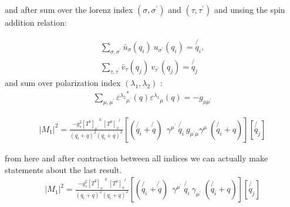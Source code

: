 and after sum over the lorenz index $({\sigma},{\sigma}^{\prime})$ and $({\tau},{\tau}^{\prime})$ and unsing the spin addition relation:
 
\begin{equation}
\begin{split}
\displaystyle\sum\limits_{{\sigma},{\sigma}^{\prime}} {\bar{u}}_{\sigma}(q_i)\:u_{{\sigma}^{\prime}}(q_i) = \not{q_i},\\
\displaystyle\sum\limits_{{\tau},{\tau}^{\prime}} {\bar{v}}_{\tau}(q_j)\:v_{{\tau}^{\prime}}(q_j) = \not{q_j}
\end{split}
\end{equation}
and sum over polarization index $({\lambda_{1}},{\lambda}_{2})$ :
\begin{equation}
\begin{split}
 \displaystyle\sum\limits_{{\mu},{\mu}^{\prime}} {{\varepsilon^{\lambda_2}}_{{\mu}^{\prime}}^* (q) {\varepsilon^{\lambda_1}}_{\mu} (q)} = -g_{{\mu}{\mu}^{\prime}}
\end{split}
\end{equation}

\begin{equation}
\begin{split}
|M_1|^2=\frac{-g_s^2  {[T^b]_{o\:^{\prime}}}^k \: {[T^a]_o}^l }{(q_i + q)^2 (q_i + q)^2}
[(\not{q_i} + \not{q}) \:
 \:  \gamma^{{\mu}^{\prime}} \: \not{q_i} \: g_{{{\mu}^{\prime}}{\mu}} 
\gamma^{\mu} \: (\not{q_i} + q)]
[\not{q_j}]
\end{split}
\end{equation}

from here and after contraction between all indices we can actually make statements about the last result.
\begin{equation}
\begin{split}
|M_1|^2=\frac{-g_s^2  {[T^b]_{o\:^{\prime}}}^k \: {[T^a]_o}^l }{(q_i + q)^2 (q_i + q)^2}
[(\not{q_i} + \not{q}) \:
 \:  \gamma^{{\mu}^{\prime}} \: \not{q_i} \: 
\gamma_{{\mu}^{\prime}} \: (\not{q_i} + q)]
[\not{q_j}]
\end{split}
\end{equation}

